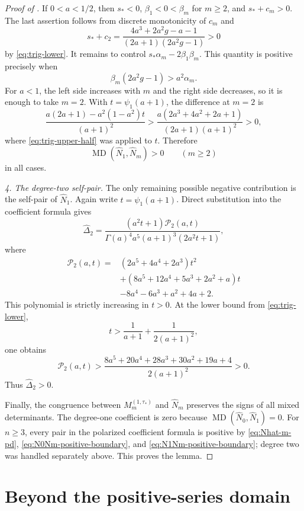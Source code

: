 \documentclass[11pt,a4paper]{amsart}
\numberwithin{equation}{section}
\theoremstyle{plain}
\theoremstyle{definition}
\newcommand{\MD}{\operatorname{MD}}
\begin{document}
\begin{proof}[Proof of ]
If \(0<a<1/2\), then \(s_*<0\), \(\beta_1<0<\beta_m\) for \(m\ge2\), and
\(s_*+c_m>0\).  The last assertion follows from discrete monotonicity of \(c_m\)
and
\[
 s_*+c_2
 =\frac{4a^3+2a^2g-a-1}{(2a+1)(2a^2g-1)}>0
\]
by \eqref{eq:trig-lower}.  It remains to control
\(s_*\alpha_m-2\beta_1\beta_m\).  This quantity is positive precisely when
\[
 \beta_m(2a^2g-1)>a^2\alpha_m.
\]
For \(a<1\), the left side increases with \(m\) and the right side decreases,
so it is enough to take \(m=2\).  With \(t=\psi_1(a+1)\), the difference at
\(m=2\) is
\[
 \frac{a(2a+1)-a^2(1-a^2)t}{(a+1)^2}
 >\frac{a(2a^3+4a^2+2a+1)}{(2a+1)(a+1)^2}>0,
\]
where \eqref{eq:trig-upper-half} was applied to \(t\).  Therefore
\begin{equation}\label{eq:N1Nm-positive-boundary}
 \MD(\widehat N_1,\widehat N_m)>0\qquad(m\ge2)
\end{equation}
in all cases.

\emph{4.  The degree-two self-pair.}
The only remaining possible negative contribution is the self-pair of
\(\widehat N_1\).  Again write \(t=\psi_1(a+1)\).  Direct substitution into the
coefficient formula gives
\begin{equation}\label{eq:boundary-delta2}
 \widehat\Delta_2
 =\frac{(a^2t+1)\mathcal P_2(a,t)}
 {\Gamma(a)^4a^5(a+1)^3(2a^2t+1)},
\end{equation}
where
\begin{align*}
 \mathcal P_2(a,t)={}&
 (2a^5+4a^4+2a^3)t^2\\
 &+(8a^5+12a^4+5a^3+2a^2+a)t\\
 &-8a^4-6a^3+a^2+4a+2.
\end{align*}
This polynomial is strictly increasing in \(t>0\).  At the lower bound from
\eqref{eq:trig-lower},
\[
 t>\frac1{a+1}+\frac1{2(a+1)^2},
\]
one obtains
\[
 \mathcal P_2(a,t)>
 \frac{8a^5+20a^4+28a^3+30a^2+19a+4}{2(a+1)^2}>0.
\]
Thus \(\widehat\Delta_2>0\).

Finally, the congruence between \(M_m^{(1,\tau_*)}\) and \(\widehat N_m\)
preserves the signs of all mixed determinants.  The degree-one coefficient is
zero because \(\MD(\widehat N_0,\widehat N_1)=0\).  For \(n\ge3\), every pair in
the polarized coefficient formula is positive by
\eqref{eq:Nhat-m-pd}, \eqref{eq:N0Nm-positive-boundary}, and
\eqref{eq:N1Nm-positive-boundary}; degree two was handled separately above.
This proves the lemma.
\end{proof}

\section{Beyond the positive-series domain}\label{app:continuation}
\end{document}
